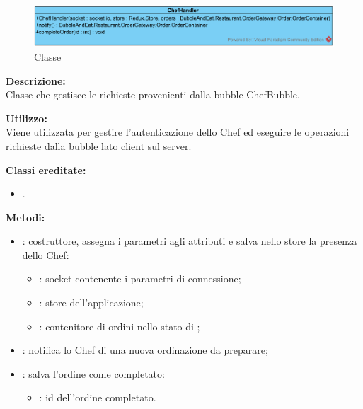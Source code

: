 \subparagraph[::ChefHandler]{\class}\mbox{}\\ \label{\class}
\begin{figure}[H]
	\centering
		\includegraphics[width=15cm]{./diagrammi/demo/server/handlers/chefhandler.png}
	\caption{Classe \class}
\end{figure}
\textbf{Descrizione:}\\
Classe che gestisce le richieste provenienti dalla bubble ChefBubble.

\textbf{Utilizzo:}\\
Viene utilizzata per gestire l'autenticazione dello Chef ed eseguire le operazioni richieste dalla bubble lato client sul server.

\textbf{Classi ereditate:}
\begin{itemize}
	\item {}.
\end{itemize}
%


\textbf{Metodi:}
\begin{itemize}
	\item {}: costruttore, assegna i parametri agli attributi e salva nello store la presenza dello Chef:
	\begin{itemize}
		\item {}: socket contenente i parametri di connessione;
		\item {}: store dell'applicazione;
		\item {}: contenitore di ordini nello stato di ;
	\end{itemize}
	\item {}: notifica lo Chef di una nuova ordinazione da preparare;
	\item {}: salva l'ordine come completato:
	\begin{itemize}
		\item {}: id dell'ordine completato.
	\end{itemize}
\end{itemize}


